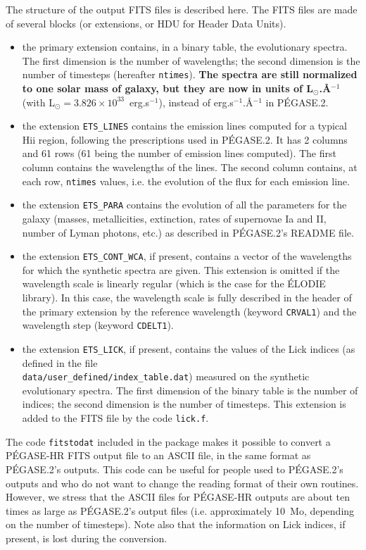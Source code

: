 \documentclass[11pt,fleqn]{article}
\begin{document}
The structure of the output FITS files is described here. The FITS
files are made of several blocks (or extensions, or HDU for Header
Data Units).
\begin{itemize}
  \item the primary extension contains, in a binary table, the
  evolutionary spectra. The first dimension is the number of wavelengths;
  the second dimension is the number of timesteps (hereafter
  \texttt{ntimes}). {\bf The spectra are still normalized to one solar 
    mass of galaxy, but they are now in units of L$_\odot$.\AA{}$^{-1}$}
  (with L$_\odot = 3.826 \times 10^{33}$~erg.s$^{-1}$), instead of erg.s$^{-1}$.\AA{}$^{-1}$ in P\'EGASE.2.
  \item the extension \texttt{ETS\_LINES} contains the emission
  lines computed for a typical H{\sc ii} region, following the prescriptions used in P\'EGASE.2. 
  It has 2 columns and 61 rows (61 being the number of emission
  lines computed). The first column contains the wavelengths of the
  lines. The second column contains, at each row, \texttt{ntimes}
  values, i.e. the evolution of the flux for each emission line.
  \item the extension \texttt{ETS\_PARA} contains the evolution of all the
  parameters for the galaxy (masses, metallicities, extinction, rates
  of supernovae Ia and II, number of Lyman photons, etc.) as described
  in P\'EGASE.2's README file.
  \item the extension \texttt{ETS\_CONT\_WCA}, if present, contains a
  vector of the wavelengths for which the synthetic spectra are
  given. This extension is omitted if the wavelength scale is linearly regular
  (which is the case for the \'ELODIE library). In this case, the
  wavelength scale is fully described in the header of the primary
  extension by the reference wavelength (keyword \texttt{CRVAL1}) and
  the wavelength step (keyword \texttt{CDELT1}).
  \item the extension \texttt{ETS\_LICK}, if present, contains the
  values of the Lick indices (as defined in the file\\
  \texttt{data/user\_defined/index\_table.dat}) measured on the
  synthetic evolutionary spectra. The first dimension of the binary table
  is the number of indices; the second dimension is the number of
  timesteps. This extension is added to the FITS file by the code
  \texttt{lick.f}.
\end{itemize}

The code \texttt{fitstodat} included in the package makes it possible
to convert a P\'EGASE-HR FITS output file to an ASCII file, in the same
format as P\'EGASE.2's outputs. This code can be useful for people used
to P\'EGASE.2's outputs and who do not want to change the reading format
of their own routines. However, we stress that the ASCII files for
P\'EGASE-HR outputs are about ten times as large as P\'EGASE.2's output
files (i.e. approximately 10~Mo, depending on the number of
timesteps).  Note also that the information on Lick indices, if
present, is lost during the conversion.
\end{document}

